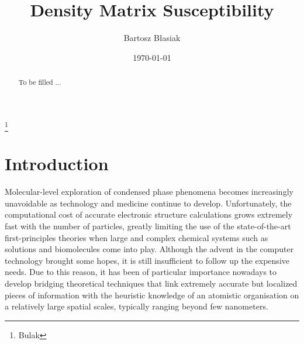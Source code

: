 \documentclass[aip,graphicx]{revtex4-1}
\begin{document}
\title{Density Matrix Susceptibility} %

\author{Bartosz B{\l}asiak}
\thanks{Bulak}

\date{\today}

\begin{abstract}
To be filled ...
\end{abstract}

\pacs{}%

\maketitle %

\section{\label{s:1}Introduction}

Molecular\hyp{}level exploration of condensed phase phenomena becomes increasingly unavoidable
as technology and medicine continue to develop. Unfortunately, the computational cost of accurate
electronic structure calculations grows extremely fast with the number of particles, greatly limiting
the use of the state\hyp{}of\hyp{}the\hyp{}art first\hyp{}principles theories 
when large and complex chemical systems such as
solutions and biomolecules come into play. Although the advent in the computer technology 
brought some hopes, it is still insufficient to follow up the expensive needs.
Due to this reason, it has been of particular importance nowadays to develop bridging theoretical techniques that link
extremely accurate but localized pieces of information with the heuristic knowledge of an atomistic organisation 
on a relatively large spatial scales, typically ranging beyond few nanometers. 
\end{document}
